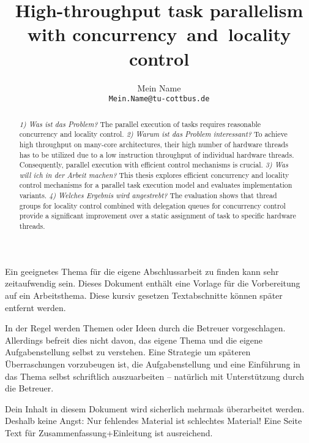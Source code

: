 \documentclass[journal]{IEEEtran}
\begin{document}
\title{High-throughput task parallelism with concurrency~and~locality control}
\author{Mein Name\protect\\\texttt{Mein.Name@tu-cottbus.de}}
\maketitle

\begin{itshape}
  Ein geeignetes Thema für die eigene Abschlussarbeit zu finden kann
  sehr zeitaufwendig sein.  Dieses Dokument enthält eine Vorlage für
  die Vorbereitung auf ein Arbeitsthema. Diese kursiv gesetzen
  Textabschnitte können später entfernt werden.

  In der Regel werden Themen oder Ideen durch die Betreuer
  vorgeschlagen.  Allerdings befreit dies nicht davon, das eigene
  Thema und die eigene Aufgabenstellung selbst zu verstehen.  Eine
  Strategie um späteren Überraschungen vorzubeugen ist, die
  Aufgabenstellung und eine Einführung in das Thema selbst schriftlich
  auszuarbeiten -- natürlich mit Unterstützung durch die Betreuer.
  
  Dein Inhalt in diesem Dokument wird sicherlich mehrmals überarbeitet
  werden. Deshalb keine Angst: Nur fehlendes Material ist schlechtes
  Material! Eine Seite Text für Zusammenfassung+Einleitung ist
  ausreichend.
\end{itshape}

\begin{abstract}
  \textit{1) Was ist das Problem?}
  The parallel execution of tasks requires reasonable concurrency and
  locality control.
  \textit{2) Warum ist das Problem interessant?}
  To achieve high throughput on many-core architectures, their high
  number of hardware threads has to be utilized due to a low
  instruction throughput of individual hardware threads.
  Consequently, parallel execution with efficient control mechanisms
  is crucial.
  \textit{3) Was will ich in der Arbeit machen?}
  This thesis explores efficient concurrency and locality control
  mechanisms for a parallel task execution model and evaluates
  implementation variants.
  \textit{4) Welches Ergebnis wird angestrebt?}
  The evaluation shows that thread groups for locality control
  combined with delegation queues for concurrency control provide a
  significant improvement over a static assignment of task to specific
  hardware threads.
\end{abstract}
\end{document}
